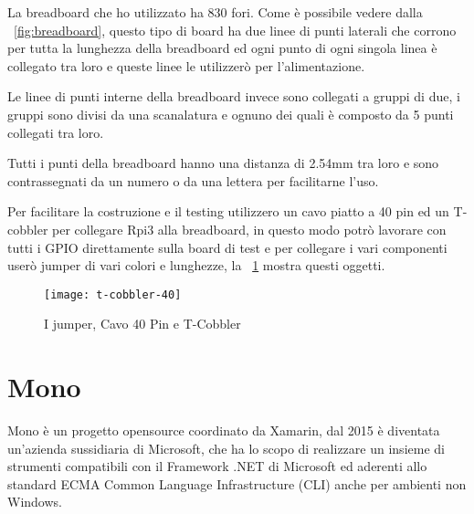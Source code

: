 La breadboard che ho utilizzato ha 830 fori. Come è possibile vedere dalla \figurename~\ref{fig:breadboard}, questo tipo di board ha due linee di punti laterali che corrono per tutta la lunghezza della breadboard ed ogni punto di ogni singola linea è collegato tra loro e queste linee le utilizzerò per l’alimentazione. 

Le linee di punti interne della breadboard invece sono collegati a gruppi di due, i gruppi sono divisi da una scanalatura e ognuno dei quali è composto da 5 punti collegati tra loro.

Tutti i punti della breadboard  hanno una distanza di 2.54mm tra loro e sono contrassegnati da un numero o da una lettera per facilitarne l'uso.

Per facilitare la costruzione e il testing utilizzero un cavo piatto a 40 pin ed un T-cobbler per collegare Rpi3 alla breadboard, in questo modo potrò lavorare con tutti i GPIO direttamente sulla board di test e per collegare i vari componenti userò jumper di vari colori e lunghezze, la \figurename~\ref{fig:t-cobbler-40} mostra questi oggetti. 


\begin{figure}[htbp!] 
	\centering    
	\texttt{[image: t-cobbler-40]}
	\caption[t-cobbler-40]{I jumper, Cavo 40 Pin e T-Cobbler}
	\label{fig:t-cobbler-40}
\end{figure}


\section{Mono}
Mono è un progetto opensource coordinato da Xamarin, dal 2015 è diventata un'azienda sussidiaria di Microsoft, che ha lo scopo di realizzare  un insieme di strumenti compatibili con il Framework .NET di Microsoft ed aderenti allo standard  ECMA Common Language Infrastructure (CLI)  anche per ambienti non Windows.


